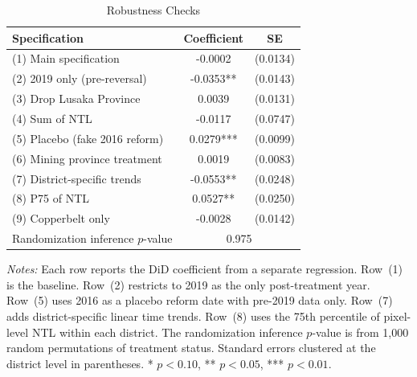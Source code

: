 \begin{table}[htbp]
\centering
\caption{Robustness Checks}
\label{tab:robust}
\begin{tabular}{lcc}
\hline\hline
Specification & Coefficient & SE \\
\hline
\addlinespace
(1) Main specification & -0.0002 & (0.0134) \\
(2) 2019 only (pre-reversal) & -0.0353** & (0.0143) \\
(3) Drop Lusaka Province & 0.0039 & (0.0131) \\
(4) Sum of NTL & -0.0117 & (0.0747) \\
(5) Placebo (fake 2016 reform) & 0.0279*** & (0.0099) \\
(6) Mining province treatment & 0.0019 & (0.0083) \\
(7) District-specific trends & -0.0553** & (0.0248) \\
(8) P75 of NTL & 0.0527** & (0.0250) \\
(9) Copperbelt only & -0.0028 & (0.0142) \\
\addlinespace
Randomization inference $p$-value & \multicolumn{2}{c}{0.975} \\
\hline\hline
\end{tabular}
\begin{tablenotes}
\item \textit{Notes:} Each row reports the DiD coefficient from a separate regression. Row~(1) is the baseline. Row~(2) restricts to 2019 as the only post-treatment year. Row~(5) uses 2016 as a placebo reform date with pre-2019 data only. Row~(7) adds district-specific linear time trends. Row~(8) uses the 75th percentile of pixel-level NTL within each district. The randomization inference $p$-value is from 1,000 random permutations of treatment status. Standard errors clustered at the district level in parentheses. * $p<0.10$, ** $p<0.05$, *** $p<0.01$.
\end{tablenotes}
\end{table}

